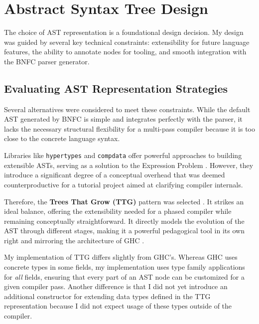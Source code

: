 \section{Abstract Syntax Tree Design}
\label{sec:Design:AST}

The choice of AST representation is a foundational design decision. My design was guided by several key technical constraints: extensibility for future language features, the ability to annotate nodes for tooling, and smooth integration with the BNFC parser generator.

\subsection{Evaluating AST Representation Strategies}
Several alternatives were considered to meet these constraints. While the default AST generated by BNFC is simple and integrates perfectly with the parser, it lacks the necessary structural flexibility for a multi-pass compiler because it is too close to the concrete language syntax.

Libraries like \texttt{hypertypes} \cite{hypertypes-hackage} and \texttt{compdata} \cite{compdata-hackage} offer powerful approaches to building extensible ASTs, serving as a solution to the Expression Problem \cite{wadler-expression-1998}. However, they introduce a significant degree of a conceptual overhead that was deemed counterproductive for a tutorial project aimed at clarifying compiler internals.

Therefore, the \textbf{Trees That Grow (TTG)} pattern was selected \cite{trees-that-grow-2016}. It strikes an ideal balance, offering the extensibility needed for a phased compiler while remaining conceptually straightforward. It directly models the evolution of the AST through different stages, making it a powerful pedagogical tool in its own right and mirroring the architecture of GHC \cite{ghc-gitlab-2025}.



\enlargethispage{\baselineskip}
My implementation of TTG differs slightly from GHC's. Whereas GHC uses concrete types in some fields, my implementation uses type family applications for \textit{all} fields, ensuring that every part of an AST node can be customized for a given compiler pass. Another difference is that I did not yet introduce an additional constructor for extending data types defined in the TTG representation because I did not expect usage of these types outside of the \Arralac compiler.

